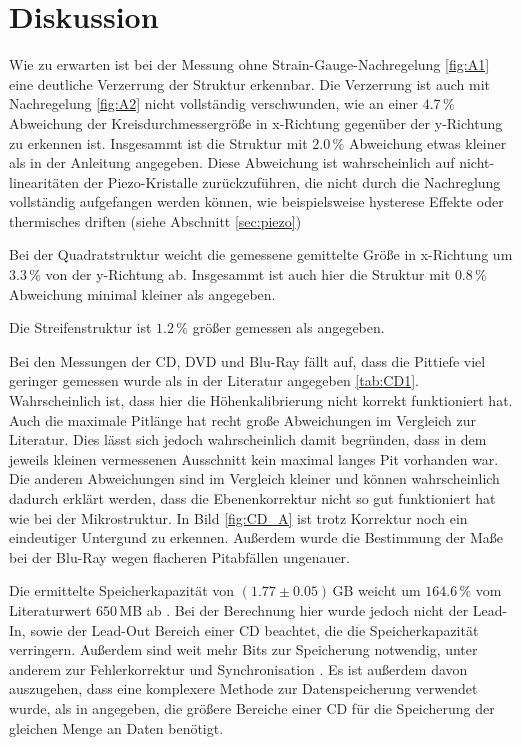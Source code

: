 \newpage
\section{Diskussion}
\label{sec:conclusion}

Wie zu erwarten ist bei der Messung ohne Strain-Gauge-Nachregelung \ref{fig:A1}
eine deutliche Verzerrung der Struktur erkennbar.
Die Verzerrung ist auch mit Nachregelung \ref{fig:A2} nicht vollständig verschwunden,
wie an einer $4.7\,\si{\percent}$ Abweichung der Kreisdurchmessergröße in x-Richtung gegenüber der y-Richtung zu erkennen ist.
Insgesammt ist die Struktur mit $2.0\,\si{\percent}$ Abweichung etwas kleiner als in der Anleitung angegeben. 
Diese Abweichung ist wahrscheinlich auf nicht-linearitäten der Piezo-Kristalle zurückzuführen, die nicht durch die Nachreglung vollständig aufgefangen werden können,
wie beispielsweise hysterese Effekte oder thermisches driften (siehe Abschnitt \ref{sec:piezo})

Bei der Quadratstruktur weicht die gemessene gemittelte Größe in x-Richtung um $3.3\,\si{\percent}$ von der y-Richtung ab.
Insgesammt ist auch hier die Struktur mit $0.8\,\si{\percent}$ Abweichung minimal kleiner als angegeben.

Die Streifenstruktur ist $1.2\,\si{\percent}$ größer gemessen als angegeben.


Bei den Messungen der CD, DVD und Blu-Ray fällt auf, dass die Pittiefe viel geringer gemessen wurde 
als in der Literatur angegeben \ref{tab:CD1}. Wahrscheinlich ist, dass hier die Höhenkalibrierung nicht korrekt funktioniert hat.
Auch die maximale Pitlänge hat recht große Abweichungen im Vergleich zur Literatur. Dies lässt sich jedoch wahrscheinlich damit begründen,
dass in dem jeweils kleinen vermessenen Ausschnitt kein maximal langes Pit vorhanden war.
Die anderen Abweichungen sind im Vergleich kleiner und können wahrscheinlich dadurch erklärt werden, dass die Ebenenkorrektur nicht so gut funktioniert hat wie bei der Mikrostruktur.
In Bild \ref{fig:CD_A} ist trotz Korrektur noch ein eindeutiger Untergund zu erkennen. Außerdem wurde die Bestimmung der Maße bei der
Blu-Ray wegen flacheren Pitabfällen ungenauer.

Die ermittelte Speicherkapazität von $(1.77\pm0.05)\,$GB weicht um $164.6\,\si{\percent}$ vom Literaturwert $650\,$MB ab \cite{CD}.
Bei der Berechnung hier wurde jedoch nicht der Lead-In, sowie der Lead-Out Bereich einer CD
beachtet, die die Speicherkapazität verringern. Außerdem sind weit mehr Bits zur Speicherung notwendig, unter
anderem zur Fehlerkorrektur und Synchronisation \cite{CD2}. Es ist außerdem davon auszugehen, dass 
eine komplexere Methode zur Datenspeicherung verwendet wurde, als in \cite{anleitung} angegeben, die größere Bereiche einer CD für die Speicherung der gleichen Menge an Daten benötigt.



